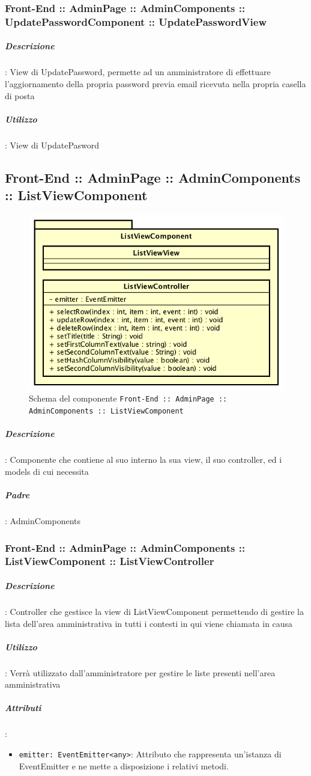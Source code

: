 \documentclass[../ManualeSviluppatore_v2.0.0.tex]{subfiles}
\begin{document}
				\subsubsection{Front-End :: AdminPage :: AdminComponents :: UpdatePasswordComponent :: UpdatePasswordView}

		      		\subparagraph{Descrizione}: View di UpdatePassword, permette ad un amministratore di effettuare l'aggiornamento della propria password previa email ricevuta nella propria casella di posta
			      	\subparagraph{Utilizzo}: View di UpdatePasword


	\newpage
	\subsection{Front-End :: AdminPage :: AdminComponents :: ListViewComponent}
	\begin{figure}[!h]
		\centering
		\includegraphics[scale=0.6]{Architettura/Front-End/AdminPage/AdminComponents/ListViewComponent.png}
		\caption{Schema del componente \texttt{Front-End :: AdminPage :: AdminComponents :: ListViewComponent}}
	\end{figure}

			\subparagraph{Descrizione}: Componente che contiene al suo interno la sua view, il suo controller, ed i models di cui necessita
			\subparagraph{Padre}: AdminComponents
			      \subsubsection{Front-End :: AdminPage :: AdminComponents :: ListViewComponent :: ListViewController}
			      	\subparagraph{Descrizione}: Controller che gestisce la view di ListViewComponent permettendo di gestire la lista dell'area amministrativa in tutti i contesti in qui viene chiamata in causa
			      	\subparagraph{Utilizzo}: Verrà utilizzato dall'amministratore per gestire le liste presenti nell'area amministrativa
			      	\subparagraph{Attributi}:
			      	      \begin{itemize}
			      	      	\item \texttt{emitter: EventEmitter<any>}: Attributo che rappresenta un'istanza di EventEmitter e ne mette a disposizione i relativi metodi.
			      	      \end{itemize}
\end{document}
